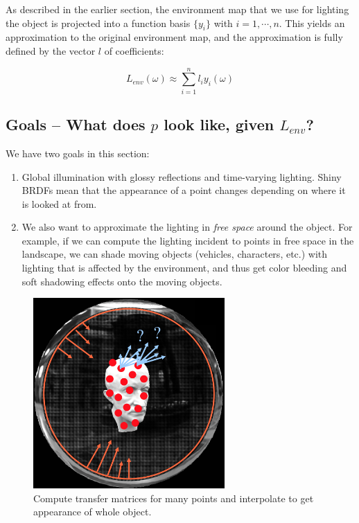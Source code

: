 As described in the earlier section, the environment map that we use for lighting the object is projected into a function basis $\{y_i\}$ with $i=1,\cdots,n$. This yields an approximation to the original environment map, and the approximation is fully defined by the vector $l$ of coefficients:

\begin{equation*}
	L_{env}(\omega)\approx\sum^{n}_{i=1}l_iy_i(\omega)
\end{equation*} 




\subsection{Goals -- What does $p$ look like, given $L_{env}$?}
We have two goals in this section:

\begin{enumerate}
	\item Global illumination with glossy reflections and time-varying lighting. Shiny BRDFs mean that the appearance of a point changes depending on where it is looked at from.
	\item We also want to approximate the lighting in \textit{free space} around the object. For example, if we can compute the lighting incident to points in free space in the landscape, we can shade moving objects (vehicles, characters, etc.) with lighting that is affected by the environment, and thus get color bleeding and soft shadowing effects onto the moving objects.
\end{enumerate}

\begin{figure}
\sidecaption
	\includegraphics[width=0.65\textwidth]{graphics/prt/prt-8-1}
	\caption{Compute transfer matrices for many points and interpolate to get appearance of whole object.}
	\label{f:prt-goal-1}
\end{figure}

